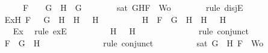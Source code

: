 \begin{isabellebody}
\ \ \ \ \ \ \ \ \ \ \ \ \ \ F\ {\isacharequal}\ \isactrlbold {\isasymnot}\ {\isacharparenleft}\isactrlbold {\isasymnot}\ G{\isacharparenright}\ {\isasymand}\ H\ {\isacharequal}\ G{\isachardoublequoteclose}\isanewline
\ \ \ \ \ \ \isamarkupfalse%
\ {\isachardoublequoteopen}sat\ {\isacharparenleft}{\isacharbraceleft}G{\isacharcomma}H{\isacharcomma}F{\isacharbraceright}\ {\isasymunion}\ Wo{\isacharparenright}{\isachardoublequoteclose}\isanewline
\ \ \ \ \ \ \isamarkupfalse%
\ {\isacharparenleft}rule\ disjE{\isacharparenright}\isanewline
\ \ \ \ \ \ \ \ \isamarkupfalse%
\ Ex{}{\isacharcolon}{\isachardoublequoteopen}{\isasymexists}H{}{\isachardot}\ F\ {\isacharequal}\ \isactrlbold {\isasymnot}\ {\isacharparenleft}G\ \isactrlbold {\isasymrightarrow}\ H{}{\isacharparenright}\ {\isasymand}\ H\ {\isacharequal}\ \isactrlbold {\isasymnot}\ H{}{\isachardoublequoteclose}\isanewline
\ \ \ \ \ \ \ \ \isamarkupfalse%
\ H{}\ \ {}{\isacharcolon}{\isachardoublequoteopen}F\ {\isacharequal}\ \isactrlbold {\isasymnot}{\isacharparenleft}G\ \isactrlbold {\isasymrightarrow}\ H{}{\isacharparenright}\ {\isasymand}\ H\ {\isacharequal}\ \isactrlbold {\isasymnot}\ H{}{\isachardoublequoteclose}\isanewline
\ \ \ \ \ \ \ \ \ \ \isamarkupfalse%
\ Ex{}\ \isamarkupfalse%
\ {\isacharparenleft}rule\ exE{\isacharparenright}\isanewline
\ \ \ \ \ \ \ \ \isamarkupfalse%
\ {\isachardoublequoteopen}H\ {\isacharequal}\ \isactrlbold {\isasymnot}\ H{}{\isachardoublequoteclose}\isanewline
\ \ \ \ \ \ \ \ \ \ \isamarkupfalse%
\ {}\ \isamarkupfalse%
\ {\isacharparenleft}rule\ conjunct{}{\isacharparenright}\isanewline
\ \ \ \ \ \ \ \ \isamarkupfalse%
\ {\isachardoublequoteopen}F\ {\isacharequal}\ \isactrlbold {\isasymnot}{\isacharparenleft}G\ \isactrlbold {\isasymrightarrow}\ H{}{\isacharparenright}{\isachardoublequoteclose}\isanewline
\ \ \ \ \ \ \ \ \ \ \isamarkupfalse%
\ {}\ \isamarkupfalse%
\ {\isacharparenleft}rule\ conjunct{}{\isacharparenright}\isanewline
\ \ \ \ \ \ \ \ \isamarkupfalse%
\ {\isachardoublequoteopen}sat\ {\isacharparenleft}{\isacharbraceleft}G{\isacharcomma}\ \isactrlbold {\isasymnot}\ H{}{\isacharcomma}\ F{\isacharbraceright}\ {\isasymunion}\ Wo{\isacharparenright}{\isachardoublequoteclose}\isanewline

\end{isabellebody}

